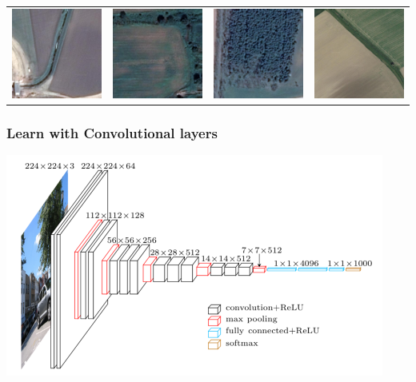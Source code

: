 \documentclass[color=usenames,dvipsnames]{beamer}
\begin{document}
\begin{frame}
\begin{table}[ht]
\centering
\begin{tabular}{cccc}
\includegraphics[width=0.2\linewidth]{../figures/no_wt_at_1.png}&
\includegraphics[width=0.2\linewidth]{../figures/no_wt_at_2.png}&
\includegraphics[width=0.2\linewidth]{../figures/no_wt_at_3.png}&
\includegraphics[width=0.2\linewidth]{../figures/no_wt_at_4.png}\\
\end{tabular}
\end{table}






\end{frame}


\begin{frame}
\frametitle{Learn with Convolutional layers}

\begin{center}
	\includegraphics[width=0.8\linewidth]{../figures/vgg16.png}
\end{center}

\end{frame}
\end{document}
